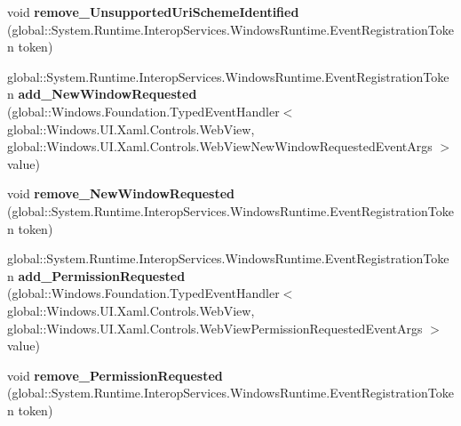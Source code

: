 \begin{DoxyCompactItemize}
\item 
\mbox{\label{class_windows_1_1_u_i_1_1_xaml_1_1_controls_1_1_web_view_ad9d3699273170c52d3176dbe3a72da3a}} 
void {\bfseries remove\+\_\+\+Unsupported\+Uri\+Scheme\+Identified} (global\+::\+System.\+Runtime.\+Interop\+Services.\+Windows\+Runtime.\+Event\+Registration\+Token token)
\item 
\mbox{\label{class_windows_1_1_u_i_1_1_xaml_1_1_controls_1_1_web_view_a6b7292bb084d6e2cc42455ef1fb709cb}} 
global\+::\+System.\+Runtime.\+Interop\+Services.\+Windows\+Runtime.\+Event\+Registration\+Token {\bfseries add\+\_\+\+New\+Window\+Requested} (global\+::\+Windows.\+Foundation.\+Typed\+Event\+Handler$<$ global\+::\+Windows.\+U\+I.\+Xaml.\+Controls.\+Web\+View, global\+::\+Windows.\+U\+I.\+Xaml.\+Controls.\+Web\+View\+New\+Window\+Requested\+Event\+Args $>$ value)
\item 
\mbox{\label{class_windows_1_1_u_i_1_1_xaml_1_1_controls_1_1_web_view_a9554c3ce448a56cf2c7e53f12a9b64ab}} 
void {\bfseries remove\+\_\+\+New\+Window\+Requested} (global\+::\+System.\+Runtime.\+Interop\+Services.\+Windows\+Runtime.\+Event\+Registration\+Token token)
\item 
\mbox{\label{class_windows_1_1_u_i_1_1_xaml_1_1_controls_1_1_web_view_a8b195c1782d78e750cd3a8375052a2ac}} 
global\+::\+System.\+Runtime.\+Interop\+Services.\+Windows\+Runtime.\+Event\+Registration\+Token {\bfseries add\+\_\+\+Permission\+Requested} (global\+::\+Windows.\+Foundation.\+Typed\+Event\+Handler$<$ global\+::\+Windows.\+U\+I.\+Xaml.\+Controls.\+Web\+View, global\+::\+Windows.\+U\+I.\+Xaml.\+Controls.\+Web\+View\+Permission\+Requested\+Event\+Args $>$ value)
\item 
\mbox{\label{class_windows_1_1_u_i_1_1_xaml_1_1_controls_1_1_web_view_ab7d2f3b264215a8d319fb8066899a6c3}} 
void {\bfseries remove\+\_\+\+Permission\+Requested} (global\+::\+System.\+Runtime.\+Interop\+Services.\+Windows\+Runtime.\+Event\+Registration\+Token token)
\item 
\mbox{\label{class_windows_1_1_u_i_1_1_xaml_1_1_controls_1_1_web_view_a1f6e579edf410985e15871fe75731922}} 

\end{DoxyCompactItemize}
